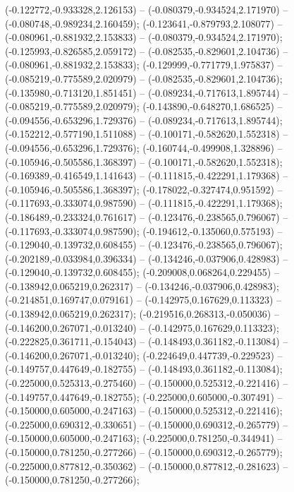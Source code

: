  (-0.122772,-0.933328,2.126153) -- (-0.080379,-0.934524,2.171970) -- (-0.080748,-0.989234,2.160459);
 (-0.123641,-0.879793,2.108077) -- (-0.080961,-0.881932,2.153833) -- (-0.080379,-0.934524,2.171970);
 (-0.125993,-0.826585,2.059172) -- (-0.082535,-0.829601,2.104736) -- (-0.080961,-0.881932,2.153833);
 (-0.129999,-0.771779,1.975837) -- (-0.085219,-0.775589,2.020979) -- (-0.082535,-0.829601,2.104736);
 (-0.135980,-0.713120,1.851451) -- (-0.089234,-0.717613,1.895744) -- (-0.085219,-0.775589,2.020979);
 (-0.143890,-0.648270,1.686525) -- (-0.094556,-0.653296,1.729376) -- (-0.089234,-0.717613,1.895744);
 (-0.152212,-0.577190,1.511088) -- (-0.100171,-0.582620,1.552318) -- (-0.094556,-0.653296,1.729376);
 (-0.160744,-0.499908,1.328896) -- (-0.105946,-0.505586,1.368397) -- (-0.100171,-0.582620,1.552318);
 (-0.169389,-0.416549,1.141643) -- (-0.111815,-0.422291,1.179368) -- (-0.105946,-0.505586,1.368397);
 (-0.178022,-0.327474,0.951592) -- (-0.117693,-0.333074,0.987590) -- (-0.111815,-0.422291,1.179368);
 (-0.186489,-0.233324,0.761617) -- (-0.123476,-0.238565,0.796067) -- (-0.117693,-0.333074,0.987590);
 (-0.194612,-0.135060,0.575193) -- (-0.129040,-0.139732,0.608455) -- (-0.123476,-0.238565,0.796067);
 (-0.202189,-0.033984,0.396334) -- (-0.134246,-0.037906,0.428983) -- (-0.129040,-0.139732,0.608455);
 (-0.209008,0.068264,0.229455) -- (-0.138942,0.065219,0.262317) -- (-0.134246,-0.037906,0.428983);
 (-0.214851,0.169747,0.079161) -- (-0.142975,0.167629,0.113323) -- (-0.138942,0.065219,0.262317);
 (-0.219516,0.268313,-0.050036) -- (-0.146200,0.267071,-0.013240) -- (-0.142975,0.167629,0.113323);
 (-0.222825,0.361711,-0.154043) -- (-0.148493,0.361182,-0.113084) -- (-0.146200,0.267071,-0.013240);
 (-0.224649,0.447739,-0.229523) -- (-0.149757,0.447649,-0.182755) -- (-0.148493,0.361182,-0.113084);
 (-0.225000,0.525313,-0.275460) -- (-0.150000,0.525312,-0.221416) -- (-0.149757,0.447649,-0.182755);
 (-0.225000,0.605000,-0.307491) -- (-0.150000,0.605000,-0.247163) -- (-0.150000,0.525312,-0.221416);
 (-0.225000,0.690312,-0.330651) -- (-0.150000,0.690312,-0.265779) -- (-0.150000,0.605000,-0.247163);
 (-0.225000,0.781250,-0.344941) -- (-0.150000,0.781250,-0.277266) -- (-0.150000,0.690312,-0.265779);
 (-0.225000,0.877812,-0.350362) -- (-0.150000,0.877812,-0.281623) -- (-0.150000,0.781250,-0.277266);
